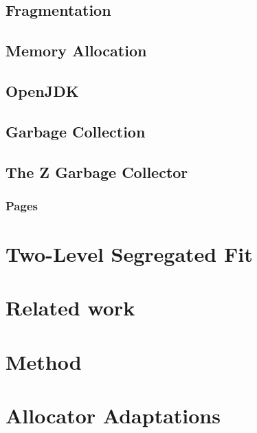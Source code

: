 \documentclass[a4paper,12pt]{article}
\begin{document}
\subsection{Fragmentation}
\label{sec:fragmentation}


\subsection{Memory Allocation}
\label{sec:memory_allocation}


\newpage
\subsection{OpenJDK}
\label{sec:openjdk}


\subsection{Garbage Collection}
\label{sec:gc}


\subsection{The Z Garbage Collector}
\label{sec:zgc}


\subsubsection{Pages}
\label{sec:zpage}


\section{Two-Level Segregated Fit}
\label{sec:tlsf}


\section{Related work}
\label{sec:related-work}


\newpage

\section{Method}
\label{sec:method}


\section{Allocator Adaptations}
\label{sec:adaptations}

\end{document}
